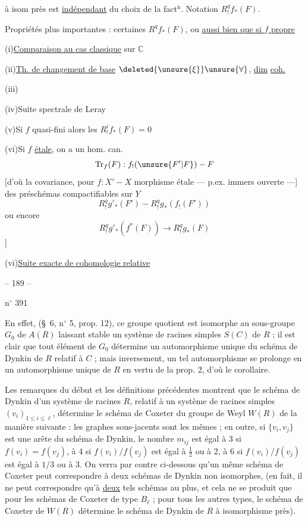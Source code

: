 

à isom près est \uline{indépendant} du
choix de la fact$^{\mathrm n}$. Notation $R^q_!f_*(F)$.

 Propriétés plus importantes : certaines
 $R^qf_*(F)$, ou \uline{aussi bien que si $f$ propre}

(i)\quad \uline{Comparaison au cas classique} sur $\mathbb C$

(ii)\quad \uline{Th. de changement de base} $\deleted{\unsure{\xi}}\unsure{\forall}$, \uline{dim} \uline{coh.}

(iii)\quad {}

(iv)\quad Suite spectrale de Leray

(v)\quad Si $f$ quasi-fini  alors les $R^i_!f_*(F)=0$

(vi)\quad Si $f$ \uline{étale}, on a un hom. can.
\[
\operatorname{Tr}_f(F):f_!(\unsure{F'|F})\mathbin{-}F
\]
[d'où la covariance, pour $f:X'\mathbin{-}X$ morphisme
étale --- p.ex. immers ouverte ---] des
préschémas compactifiables sur $Y$
\[
R^q_!g'_*(F')\mathbin{-}R^q_!g_*(f_!(F'))
\]
ou encore
\[
R^q_!g'_*(f^*(F))\longrightarrow R^q_!g_*(F)
\]
]

(vi)\quad \uline{Suite exacte de cohomologie relative}



\begin{center}-- 189 --\end{center}
\hfill n$^{\circ}$ 391

En effet, (\S\ 6, n$^{\circ}$ 5, prop. 12), ce groupe quotient est isomorphe au sous-groupe
$G_0$ de $A(R)$ laissant stable un système de racines simples $S(C)$ de $R$ ; il
est clair que tout élément de $G_0$ détermine un automorphisme unique du schéma
de Dynkin de $R$ relatif à $C$ ; mais inversement, un tel automorphisme se prolonge
en un automorphisme unique de $R$ en vertu de la prop. 2, d'où le corollaire.

Les remarques du début et les définitions précédentes montrent que le schéma
de Dynkin d'un système de racines $R$, relatif à un système de racines simples
$(v_i)_{1\leq i\leq\ell}$, détermine le schéma de Coxeter du groupe de Weyl $W(R)$ de la manière
suivante : les graphes sous-jacents sont les mêmes ; en outre, si $\{v_i,v_j\}$
est une arête du schéma de Dynkin, le nombre $m_{ij}$ est égal à 3 si $f(v_i)=f(v_j)$,
à 4 si $f(v_i)/f(v_j)$ est égal à $\frac12$ ou à 2, à 6 si $f(v_i)/f(v_j)$ est égal à $1/3$ ou
à 3. On verra par contre ci-dessous qu'un même schéma de Coxeter peut correspondre
à deux schémas de Dynkin non isomorphes, (en fait, il ne peut correspondre qu'à
\uline{deux} tels schémas au plus, et cela ne se produit que pour les schémas de Coxeter
de type $B_\ell$ ; pour tous les autres types, le schéma de Coxeter de $W(R)$ détermine
le schéma de Dynkin de $R$ à isomorphisme près).

